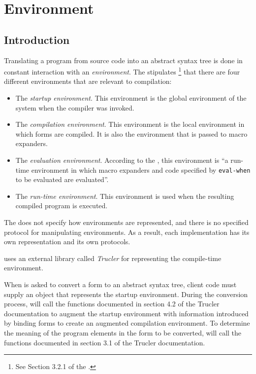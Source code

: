 \chapter{Environment}
\label{chap-environment}

\section{Introduction}

Translating a \commonlisp{} program from source code into an abstract
syntax tree is done in constant interaction with an
\emph{environment}.  The \hs{} stipulates%
\footnote{See Section 3.2.1 of the \hs{}.}
that there are four different environments that are relevant to
compilation:

\begin{itemize}
\item The \emph{startup environment}.  This environment is the global
  environment of the \commonlisp{} system when the compiler was
  invoked.
\item The \emph{compilation environment}.  This environment is the
  local environment in which forms are compiled.  It is also the
  environment that is passed to macro expanders.
\item The \emph{evaluation environment}.  According to the \hs{}, this
  environment is ``a run-time environment in which macro expanders and
  code specified by \texttt{eval-when} to be evaluated are
  evaluated''. 
\item The \emph{run-time environment}.  This environment is used when
  the resulting compiled program is executed.
\end{itemize}

The \hs{} does not specify how environments are represented, and there
is no specified protocol for manipulating environments.  As a result,
each implementation has its own representation and its own protocols. 

\sysname{} uses an external library called \emph{Trucler} for
representing the compile-time environment.

When \sysname{} is asked to convert a form to an abstract syntax tree,
client code must supply an object that represents the startup
environment.  During the conversion process, \sysname{} will call the
functions documented in section 4.2 of the Trucler documentation to
augment the startup environment with information introduced by binding
forms to create an augmented compilation environment.  To determine
the meaning of the program elements in the form to be converted,
\sysname{} will call the functions documented in section 3.1 of the
Trucler documentation.


